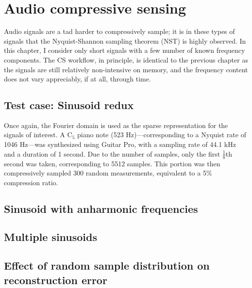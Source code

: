 \chapter{Audio compressive sensing}
\label{chap:audio-cs}

Audio signals are a tad harder to compressively sample; it is in these types of signals that the Nyquist-Shannon sampling theorem (NST) is highly observed. In this chapter, I consider only short signals with a few number of known frequency components. The CS workflow, in principle, is identical to the previous chapter as the signals are still relatively non-intensive on memory, and the frequency content does not vary appreciably, if at all, through time.

\section{Test case: Sinusoid redux}
\label{sec:1dsin}
Once again, the Fourier domain is used as the sparse representation for the signals of interest. A C$_5$ piano note (523 Hz)---corresponding to a Nyquist rate of 1046 Hz---was synthesized using Guitar Pro, with a sampling rate of 44.1 kHz and a duration of 1 second. Due to the number of samples, only the first $\frac{1}{8}$th second was taken, corresponding to 5512 samples. This portion was then compressively sampled 300 random measurements, equivalent to a 5\% compression ratio.

\section{Sinusoid with anharmonic frequencies}

\section{Multiple sinusoids}

\section{Effect of random sample distribution on reconstruction error}